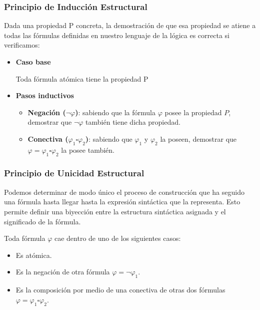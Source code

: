 \documentclass[10pt,a4paper,openright]{book}
\begin{document}
\subsubsection*{Principio de Inducción Estructural}
Dada una propiedad P concreta, la demostración de que esa propiedad se atiene a todas las fórmulas definidas en nuestro lenguaje de la lógica es correcta si verificamos:
\begin{itemize}
\item \textbf{Caso base}

Toda fórmula atómica tiene la propiedad P

\item \textbf{Pasos inductivos}
	\begin{itemize}
	\item \textbf{Negación ($\neg \varphi$)}: sabiendo que la fórmula $\varphi$ posee la propiedad $P$, demostrar que $\neg \varphi$ también tiene dicha propiedad.
	
	\item \textbf{Conectiva ($\varphi_1 \square \varphi_2$)}: sabiendo que $\varphi_1$ y $\varphi_2$ la poseen, demostrar que $\varphi = \varphi_1 \square \varphi_2$ la posee también.
	\end{itemize}
\end{itemize}

\subsubsection*{Principio de Unicidad Estructural}
Podemos determinar de modo único el proceso de construcción que ha seguido una fórmula hasta llegar hasta la expresión sintáctica que la representa. Esto permite definir una biyección entre la estructura sintáctica asignada y el significado de la fórmula.

Toda fórmula $\varphi$ cae dentro de uno de los siguientes casos:
\begin{itemize}
\item Es atómica.
\item Es la negación de otra fórmula $\varphi  = \neg \varphi_1$.
\item Es la composición por medio de una conectiva de otras dos fórmulas $\varphi = \varphi_1 \square \varphi_2$.
\end{itemize}
\end{document}
